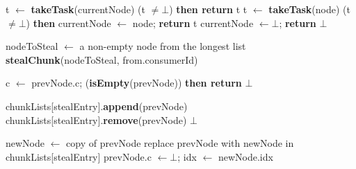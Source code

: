 \begin{algo}[!ht]
\begin{minipage}[t]{0.48\textwidth}
\begin{distribalgo}[1]
\setcounter{alg:non-fifo:lines}{\value{ALC@line}} %
\end{distribalgo}
\end{minipage}%
%
\hfill
%
\begin{minipage}[t]{0.48\textwidth}
%
\begin{distribalgo}[1]
\setcounter{ALC@line}{\value{alg:non-fifo:lines}}
\smallskip

		\STATE t $\leftarrow$ {\bf takeTask}(currentNode)
		 (t $\neq \bot$) {\bf then return} t
	\ENDINDENT
  		\STATE t $\leftarrow$ {\bf takeTask}(node)
			 (t $\neq \bot$) {\bf then} currentNode $\leftarrow$ node; {\bf return} t
  	\ENDINDENT
	\ENDINDENT
	\STATE currentNode $\leftarrow \bot$; {\bf return} $\bot$
\ENDINDENT

\medskip

	\STATE nodeToSteal $\leftarrow$ a non-empty node from the longest list
	 {\bf stealChunk}(nodeToSteal, from.consumerId)
%		
%	
\ENDINDENT

\medskip

  \STATE c $\leftarrow$ prevNode.c;
   ({\bf isEmpty}(prevNode)) {\bf then return} $\bot$

  \STATE chunkLists[stealEntry].{\bf append}(prevNode)
 		\STATE chunkLists[stealEntry].{\bf remove}(prevNode)
 		 $\bot$ 
	\ENDINDENT
	
	\smallskip
	\STATE newNode $\leftarrow$ copy of prevNode
	\STATE replace prevNode with newNode in chunkLists[stealEntry]
	\STATE prevNode.c $\leftarrow \bot$; 
	\STATE idx $\leftarrow$ newNode.idx
	

\end{distribalgo}
\end{minipage}
\end{algo}
